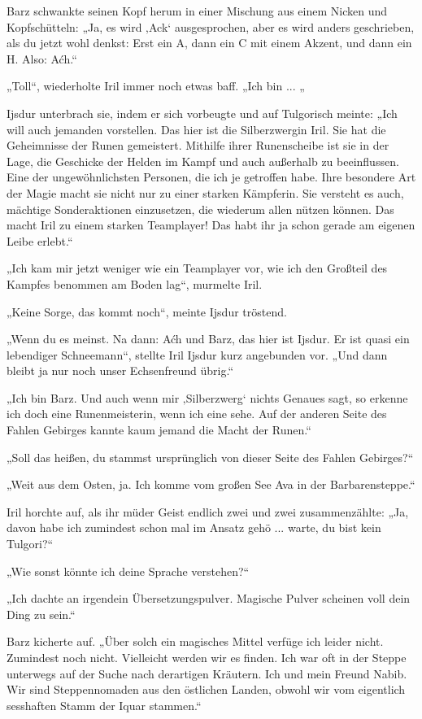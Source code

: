 Barz schwankte seinen Kopf herum in einer Mischung aus einem Nicken und Kopfschütteln: „Ja, es wird ‚Ack‘ ausgesprochen, aber es wird anders geschrieben, als du jetzt wohl denkst: Erst ein A, dann ein C mit einem Akzent, und dann ein H. Also: Aćh.“

„Toll“, wiederholte Iril immer noch etwas baff. „Ich bin ... „

Ijsdur unterbrach sie, indem er sich vorbeugte und auf Tulgorisch meinte: „Ich will auch jemanden vorstellen. Das hier ist die Silberzwergin Iril. Sie hat die Geheimnisse der Runen gemeistert. Mithilfe ihrer Runenscheibe ist sie in der Lage, die Geschicke der Helden im Kampf und auch außerhalb zu beeinflussen. Eine der ungewöhnlichsten Personen, die ich je getroffen habe. Ihre besondere Art der Magie macht sie nicht nur zu einer starken Kämpferin. Sie versteht es auch, mächtige Sonderaktionen einzusetzen, die wiederum allen nützen können. Das macht Iril zu einem starken Teamplayer! Das habt ihr ja schon gerade am eigenen Leibe erlebt.“

„Ich kam mir jetzt weniger wie ein Teamplayer vor, wie ich den Großteil des Kampfes benommen am Boden lag“, murmelte Iril.

„Keine Sorge, das kommt noch“, meinte Ijsdur tröstend.

„Wenn du es meinst. Na dann: Aćh und Barz, das hier ist Ijsdur. Er ist quasi ein lebendiger Schneemann“, stellte Iril Ijsdur kurz angebunden vor. „Und dann bleibt ja nur noch unser Echsenfreund übrig.“

„Ich bin Barz. Und auch wenn mir ‚Silberzwerg‘ nichts Genaues sagt, so erkenne ich doch eine Runenmeisterin, wenn ich eine sehe. Auf der anderen Seite des Fahlen Gebirges kannte kaum jemand die Macht der Runen.“

„Soll das heißen, du stammst ursprünglich von dieser Seite des Fahlen Gebirges?“

„Weit aus dem Osten, ja. Ich komme vom großen See Ava in der Barbarensteppe.“

Iril horchte auf, als ihr müder Geist endlich zwei und zwei zusammenzählte: „Ja, davon habe ich zumindest schon mal im Ansatz gehö ... warte, du bist kein Tulgori?“

„Wie sonst könnte ich deine Sprache verstehen?“

„Ich dachte an irgendein Übersetzungspulver. Magische Pulver scheinen voll dein Ding zu sein.“

Barz kicherte auf. „Über solch ein magisches Mittel verfüge ich leider nicht. Zumindest noch nicht. Vielleicht werden wir es finden. Ich war oft in der Steppe unterwegs auf der Suche nach derartigen Kräutern. Ich und mein Freund Nabib. Wir sind Steppennomaden aus den östlichen Landen, obwohl wir vom eigentlich sesshaften Stamm der Iquar stammen.“

